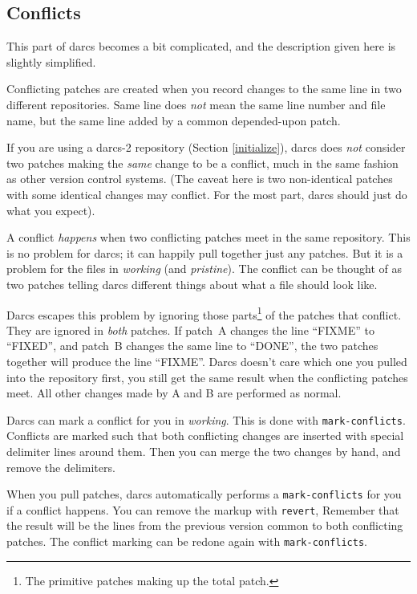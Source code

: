 \subsection{Conflicts}

This part of darcs becomes a bit complicated,
and the description given here is slightly simplified.

Conflicting patches are created when
you record changes to the same line in two different repositories.
Same line does \emph{not} mean the same line number and file name,
but the same line added by a common depended-upon patch.

If you are using a darcs-2 repository (Section \ref{initialize}),
darcs does \emph{not} consider two patches making the \emph{same} change to be a
conflict, much in the same fashion as other version control systems.
(The caveat here is two non-identical patches with some identical
changes may conflict.  For the most part, darcs should just do what you
expect).

A conflict \emph{happens} when two conflicting patches meet in the same repository.
This is no problem for darcs; it can happily pull together just any patches.
But it is a problem for the files in \emph{working} (and \emph{pristine}).
The conflict can be thought of as
two patches telling darcs different things about what a file should look like.

Darcs escapes this problem
by ignoring those parts\footnote{%
The primitive patches making up the total patch.}
of the patches that conflict.
They are ignored in \emph{both} patches.
If patch~A changes the line ``FIXME'' to ``FIXED'',
and patch~B changes the same line to ``DONE'',
the two patches together will produce the line ``FIXME''.
Darcs doesn't care which one you pulled into the repository first,
you still get the same result when the conflicting patches meet.
All other changes made by A and B are performed as normal.

Darcs can mark a conflict for you in \emph{working}.
This is done with \verb|mark-conflicts|.
Conflicts are marked such that both conflicting changes
are inserted with special delimiter lines around them.
Then you can merge the two changes by hand,
and remove the delimiters.

When you pull patches,
darcs automatically performs a \verb|mark-conflicts| for you if a conflict happens.
You can remove the markup with \verb|revert|,
Remember that the result will be the lines from
the previous version common to both conflicting patches.
The conflict marking can be redone again with \verb|mark-conflicts|.

